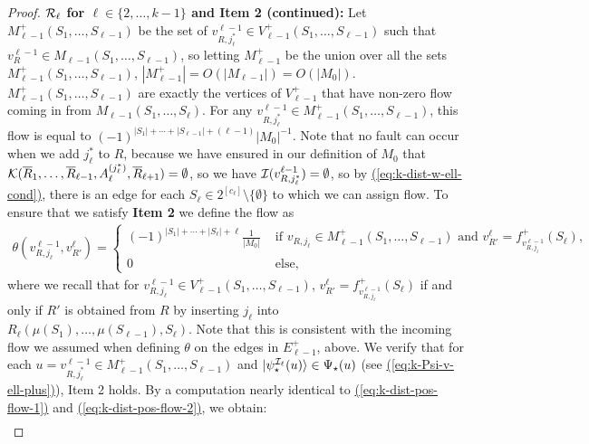 \documentclass{article}
\newcommand{\eq}[1]{\hyperref[eq:#1]{(\ref*{eq:#1})}}
\def\ket#1{{\lvert}#1\rangle}
\renewcommand{\>}{\rangle}
\newcommand{\<}{\langle}
\renewcommand{\(}{\left(}
\renewcommand{\)}{\right)}
\def\abs#1{\left| #1 \right|}
\begin{document}
\begin{proof}
\vskip7pt	
\noindent\textbf{${\cal R}_{\ell}$ for $\ell \in \{2,\dots,k-1\}$ and Item 2 (continued):} Let $M_{\ell-1}^{+}(S_1,\dots,S_{\ell-1})$ be the set of $v^{\ell-1}_{R,j^*_{\ell}}\in V_{\ell-1}^+(S_1,\dots,S_{\ell-1})$ such that $v^{\ell-1}_{R}\in M_{\ell-1}(S_1,\dots,S_{\ell-1})$, so letting $M_{\ell-1}^+$ be the union over all the sets $M_{\ell-1}^+(S_1,\dots,S_{\ell-1})$, $\abs{M_{\ell-1}^{+}} = O\left(\abs{M_{\ell-1}}\right) =  O\left(\abs{M_0}\right)$. $M_{\ell-1}^+(S_1,\dots,S_{\ell-1})$ are exactly the vertices of $V_{\ell-1}^+$ that have non-zero flow coming in from $M_{\ell-1}(S_1,\dots,S_{\ell})$. For any $v^{\ell-1}_{R,j^*_{\ell}}\in M_{\ell-1}^+(S_1,\dots,S_{\ell-1})$, this flow is equal to $(-1)^{\abs{S_1} + \cdots +\abs{S_{\ell-1}}+(\ell-1)}{\abs{M_0}}^{-1}$. Note that no fault can occur when we add $j_{\ell}^*$ to $R$, because we have ensured in our definition of $M_0$ that ${\cal K}(\overline{R}_1,\dots,\overline{R}_{\ell-1},A_{\ell}^{(j_{\ell}^*)},\overline{R}_{\ell+1})=\emptyset$, so we have ${\cal I}(v_{R,j_{\ell}^*}^{\ell-1})=\emptyset$, so by \eq{k-dist-w-ell-cond}, there is an edge for each $S_{\ell}\in 2^{[c_{\ell}]}\setminus\{\emptyset\}$ to which we can assign flow. 
To ensure that we satisfy \textbf{Item 2} we define the flow as
		\begin{align}\label{eq:k-dist-theta-later}
			 \theta(v^{\ell-1}_{R,j_{\ell}},v_{R'}^{\ell}) 
= \begin{cases}
			\left(-1\right)^{\abs{S_1} + \cdots +\abs{S_{\ell}}+\ell}\frac{1}{\abs{M_0}} &\text{ if } v_{R,j_{\ell}} \in M_{\ell-1}^+(S_1,\dots,S_{\ell-1}) \text{ and } v_{R'}^{\ell}=f^+_{v^{\ell-1}_{R,j_{\ell}}}(S_{\ell}),\\
			0 &\text{ else},
			\end{cases}
		\end{align}
where we recall that for $v_{R,j_{\ell}}^{\ell-1}\in V_{\ell-1}^+(S_1,\dots,S_{\ell-1})$, $v_{R'}^{\ell}=f^+_{v_{R,j_{\ell}}^{\ell-1}}(S_{\ell})$ if and only if $R'$ is obtained from $R$ by inserting $j_{\ell}$ into $R_{\ell}(\mu(S_1),\dots,\mu(S_{\ell-1}),S_{\ell})$. Note that this is consistent with the incoming flow we assumed when defining $\theta$ on the edges in $E_{\ell-1}^+$, above. 
We verify that for each $u=v_{R,j_{\ell}^*}^{\ell-1}\in M_{\ell-1}^+(S_1,\dots,S_{\ell-1})$ and $\ket{\psi^{{\cal I}_{\ell}}_\star(u)}\in \Psi_\star(u)$ (see \eq{k-Psi-v-ell-plus}), Item 2 holds. By a computation nearly identical to \eq{k-dist-pos-flow-1} and \eq{k-dist-pos-flow-2}, we obtain:
\begin{align*}

\end{align*}
\end{proof}
\end{document}
